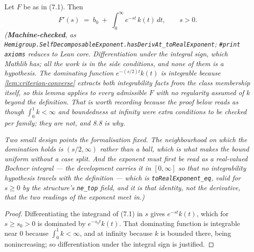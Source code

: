 \begin{lemma}\label{lem:memory-kernel}
\leanok
Let $F$ be as in (7.1). Then
\[
  F'(s) \;=\; b_0 \;+\; \int_0^\infty e^{-st}\, k(t)\,dt, \qquad s > 0.
\]
\statusT\quad\emph{(\textbf{Machine-checked}, as
\texttt{Hemigroup.SelfDecomposableExponent.hasDerivAt\_toRealExponent}; \texttt{\#print axioms}
reduces to Lean core. Differentiation under the integral sign, which Mathlib has; all the work is
in the side conditions, and \emph{none of them is a hypothesis}. The dominating function
$e^{-(s/2)t}k(t)$ is integrable because \ref{lem:criterion-converse} extracts both integrability
facts from the class membership itself, so this lemma applies to every admissible $F$ with no
regularity assumed of $k$ beyond the definition. That is worth recording because the proof below
reads as though $\int_0^1 k < \infty$ and boundedness at infinity were extra conditions to be
checked per family; they are not, and 8.8 is why.}

\emph{Two small design points the formalisation fixed. The neighbourhood on which the domination
holds is $(s/2,\infty)$ rather than a ball, which is what makes the bound uniform without a case
split. And the exponent must first be read as a real-valued Bochner integral --- the development
carries it in $[0,\infty]$ so that no integrability hypothesis travels with the definition ---
which is \texttt{toRealExponent\_eq}, valid for $s \ge 0$ by the structure's \texttt{ne\_top}
field, and it is that identity, not the derivative, that the two readings of the exponent meet
in.)}
\end{lemma}

\begin{proof}
\leanok
Differentiating the integrand of (7.1) in $s$ gives $e^{-st}k(t)$, which for $s \ge s_0 > 0$ is
dominated by $e^{-s_0 t} k(t)$. That dominating function is integrable near $0$ because
$\int_0^1 k < \infty$, and at infinity because $k$ is bounded there, being nonincreasing; so
differentiation under the integral sign is justified.
\end{proof}

